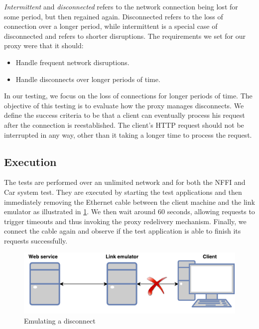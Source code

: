 \textit{Intermittent} and \textit{disconnected} refers to the network connection
being lost for some period, but then regained again. Disconnected refers to the loss
of connection over a longer period, while intermittent is a special case of
disconnected and refers to shorter disruptions. The requirements we set for our
proxy were that it should:

\begin{itemize}

    \item Handle frequent network disruptions.
    \item Handle disconnects over longer periods of time.

\end{itemize}



In our testing, we focus on the loss of connections for longer periods of time.
The objective of this testing is to evaluate how the proxy manages disconnects.
We define the success criteria to be that a client can eventually process his
request after the connection is reestablished. The client's HTTP request should
not be interrupted in any way, other than it taking a longer time to process the
request.

\subsection{Execution}

 The tests are performed over an unlimited network and for both the NFFI and Car
 system test. They are executed by starting the test applications and then
 immediately removing the Ethernet cable between the client machine and the link
 emulator as illustrated in \cref{figure-testing-disconncted}. We then wait
 around 60 seconds, allowing requests to trigger timeouts and thus invoking the
 proxy redelivery mechanism. Finally, we connect the cable again and observe if
 the test application is able to finish its requests successfully.

 \begin{figure}[h]
 \includegraphics[width=\textwidth]{images/testing_disconnected.pdf}
 \caption{Emulating a disconnect}
 \label{figure-testing-disconncted}
 \end{figure}


